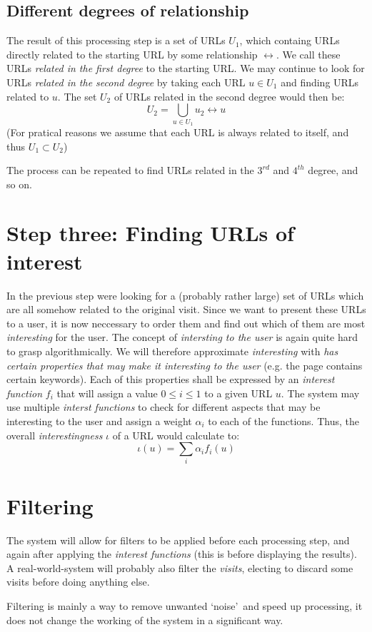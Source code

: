\documentclass[a4paper]{danarticle}
\begin{document}
     \subsection*{Different degrees of relationship}
       The result of this processing step is a set of URLs $ U_{1} $,
       which containg URLs directly related to the starting
       URL by some relationship $ \leftrightarrow $. 
       We call these URLs \textit{related in the
       first degree} to the starting URL.
       We may continue to look for URLs \textit{related in the second
       degree} by taking each URL $ u \in U_1 $ and finding URLs related
       to $ u $. The set $ U_2 $ of URLs related in the second degree would
       then be:
       \[
        U_2 = \bigcup_{u \in U_1} u_2 \leftrightarrow u
       \]
       (For pratical reasons we assume that each URL is always related
       to itself, and thus $ U_1 \subset U_2 $)
       
       The process can be repeated to find URLs related in the 
       $ 3^{rd} $ and $ 4^{th} $ degree, and so on.
       
       
  \section*{Step three: Finding URLs of interest}
    In the previous step were looking for a (probably rather large)
    set of URLs which are all somehow related to the original visit.
    Since we want to present these URLs to a user, it is now 
    neccessary to order them and find out which of them are most
    \textit{interesting} for the user. 
    The concept of \textit{intersting to the user} is again quite 
    hard to grasp algorithmically. We will therefore
    approximate \textit{interesting} with \textit{has certain
    properties that may make it interesting to the user} (e.g.
    the page contains certain keywords). Each of this properties
    shall be expressed by an \textit{interest function} $ f_i $ 
    that will assign a value $ 0 \leq i \leq 1 $ to a given URL
    $ u $. The system may use multiple \textit{interst functions}
    to check for different aspects that may be interesting
    to the user and assign a weight $ \alpha_{i} $ to each 
    of the functions. Thus, the overall \textit{interestingness}
    $ \iota $ of a URL would calculate to:
    \[
      \iota(u) = \sum_i \alpha_i f_i(u)
    \]
  
  \section*{Filtering}
    The system will allow for filters to be applied before each
    processing step, and again after applying the 
    \textit{interest functions} (this is before displaying the
    results). A real-world-system will probably also filter 
    the \textit{visits}, electing to discard some visits before
    doing anything else.
    
    Filtering is mainly a way to remove unwanted \lq noise\rq\ and
    speed up processing, it does not change the working of the
    system in a significant way.
\end{document}
